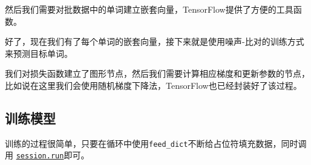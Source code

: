 然后我们需要对批数据中的单词建立嵌套向量，TensorFlow提供了方便的工具函数。

\begin{Shaded}
\begin{Highlighting}[]
\OperatorTok{=} 
\end{Highlighting}
\end{Shaded}

好了，现在我们有了每个单词的嵌套向量，接下来就是使用噪声-比对的训练方式来预测目标单词。

\begin{Shaded}
\begin{Highlighting}[]
\OperatorTok{=} 
\end{Highlighting}
\end{Shaded}

我们对损失函数建立了图形节点，然后我们需要计算相应梯度和更新参数的节点，比如说在这里我们会使用随机梯度下降法，TensorFlow也已经封装好了该过程。

\begin{Shaded}
\begin{Highlighting}[]
\OperatorTok{=} \OperatorTok{=}
\end{Highlighting}
\end{Shaded}

\subsection{训练模型 }\label{ux8badux7ec3ux6a21ux578b}

训练的过程很简单，只要在循环中使用\texttt{feed\_dict}不断给占位符填充数据，同时调用
\href{tensorflow-zh/SOURCE/api_docs/python/client.md\#Session.run}{\texttt{session.run}}即可。

\begin{Shaded}
\begin{Highlighting}[]
  
  \OperatorTok{=} 
  \OperatorTok{=} \OperatorTok{=}
\end{Highlighting}
\end{Shaded}

